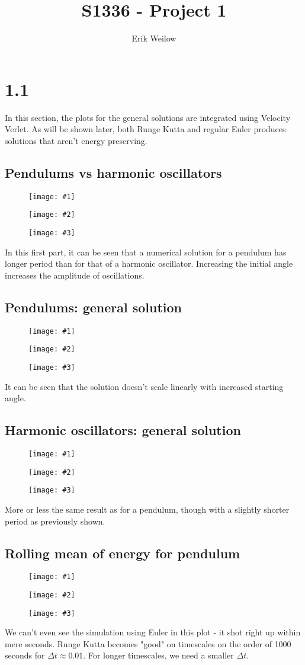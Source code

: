 \documentclass[11pt]{article}
\title{S1336 - Project 1}%
\author{Erik Weilow} %
\newcommand{\triplefigure}[3]{
\begin{figure}[H]
  \centering
  \begin{minipage}{0.3\textwidth}
    \centering
    \texttt{[image: \#1]}
  \end{minipage}
  \begin{minipage}{0.3\textwidth}
    \centering
    \texttt{[image: \#2]}
  \end{minipage}
  \begin{minipage}{0.3\textwidth}
    \centering
    \texttt{[image: \#3]}
  \end{minipage}
\end{figure}
}
\begin{document}
\maketitle
\newpage

\section*{1.1}

In this section, the plots for the general solutions are integrated using Velocity Verlet. As will be shown later, both Runge Kutta and regular Euler produces solutions that aren't energy preserving.

\subsection*{Pendulums vs harmonic oscillators}
\triplefigure{./plots/1_1/comparison_1.png}{./plots/1_1/comparison_2.png}{./plots/1_1/comparison_3.png}
In this first part, it can be seen that a numerical solution for a pendulum has longer period than for that of a harmonic oscillator.
Increasing the initial angle increases the amplitude of oscillations.

\subsection*{Pendulums: general solution}
\triplefigure{./plots/1_1/sol_pendulum_1.png}{./plots/1_1/sol_pendulum_2.png}{./plots/1_1/sol_pendulum_3.png}
It can be seen that the solution doesn't scale linearly with increased starting angle. 

\subsection*{Harmonic oscillators: general solution}
\triplefigure{./plots/1_1/sol_harmonic_1.png}{./plots/1_1/sol_harmonic_2.png}{./plots/1_1/sol_harmonic_3.png}
More or less the same result as for a pendulum, though with a slightly shorter period as previously shown. 

\subsection*{Rolling mean of energy for pendulum}
\triplefigure{./plots/1_1/rollingMean_1.png}{./plots/1_1/rollingMean_2.png}{./plots/1_1/rollingMean_3.png}
We can't even see the simulation using Euler in this plot - it shot right up within mere seconds.
Runge Kutta becomes "good" on timescales on the order of 1000 seconds for $\Delta t \approx 0.01$.
For longer timescales, we need a smaller $\Delta t$.
\end{document}
